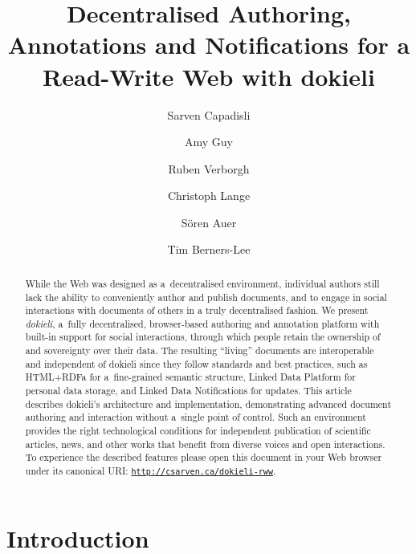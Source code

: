 \documentclass[a4paper]{llncs}
\begin{document}
\title{Decentralised Authoring, Annotations and Notifications for a Read-Write Web with dokieli}

\author{Sarven Capadisli
  \and Amy Guy
  \and Ruben Verborgh
  \and Christoph Lange
  \and Sören Auer
  \and Tim Berners-Lee}
\maketitle

\begin{abstract}
  While the Web was designed as a decentralised environment, individual authors still lack the ability to conveniently author and publish documents, and to engage in social interactions with documents of others in a truly decentralised fashion. We present \textit{dokieli}, a fully decentralised, browser-based authoring and annotation platform with built-in support for social interactions, through which people retain the ownership of and sovereignty over their data. The resulting “living” documents are interoperable and independent of dokieli since they follow standards and best practices, such as HTML+RDFa for a fine-grained semantic structure, Linked Data Platform for personal data storage, and Linked Data Notifications for updates. This article describes dokieli’s architecture and implementation, demonstrating advanced document authoring and interaction without a single point of control. Such an environment provides the right technological conditions for independent publication of scientific articles, news, and other works that benefit from diverse voices and open interactions. To experience the described features please open this document in your Web browser under its canonical URI: {\tt \href{http://csarven.ca/dokieli-rww}{http://csarven.ca/dokieli-rww}}.
\end{abstract}


\section{Introduction}
\label{introduction}
\end{document}
